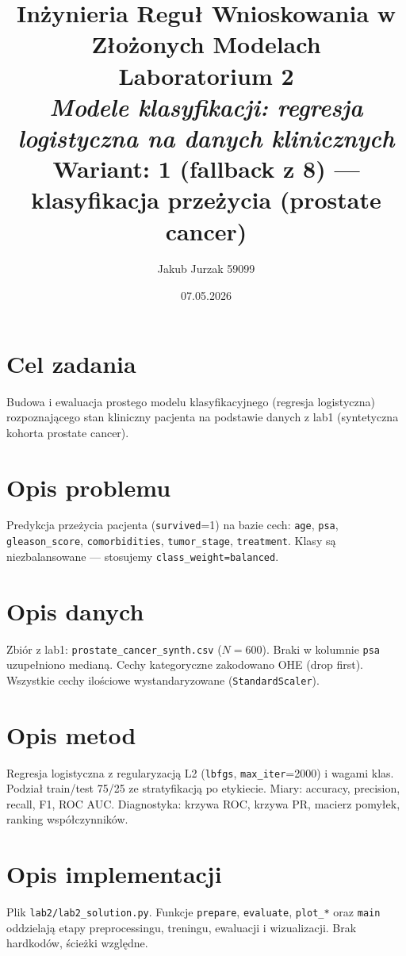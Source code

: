 \documentclass[12pt,a4paper]{article}
\title{
  \vspace{2cm}
  \LARGE\textbf{Inżynieria Reguł Wnioskowania w Złożonych Modelach}\\[0.6cm]
  \Large Laboratorium 2\\[0.4cm]
  \large \textit{Modele klasyfikacji: regresja logistyczna na danych klinicznych}\\[0.3cm]
  \normalsize Wariant: \textbf{1 (fallback z 8) — klasyfikacja przeżycia (prostate cancer)}
}
\author{Jakub Jurzak 59099}
\date{07.05.2026}
\begin{document}
\maketitle
\thispagestyle{empty}
\newpage

\tableofcontents
\newpage

\section{Cel zadania}
Budowa i ewaluacja prostego modelu klasyfikacyjnego (regresja logistyczna) rozpoznającego stan kliniczny pacjenta na podstawie danych z lab1 (syntetyczna kohorta prostate cancer).

\section{Opis problemu}
Predykcja przeżycia pacjenta (\texttt{survived}=1) na bazie cech: \texttt{age}, \texttt{psa}, \texttt{gleason\_score}, \texttt{comorbidities}, \texttt{tumor\_stage}, \texttt{treatment}. Klasy są niezbalansowane — stosujemy \texttt{class\_weight=balanced}.

\section{Opis danych}
Zbiór z lab1: \texttt{prostate\_cancer\_synth.csv} ($N=600$). Braki w kolumnie \texttt{psa} uzupełniono medianą. Cechy kategoryczne zakodowano OHE (drop first). Wszystkie cechy ilościowe wystandaryzowane (\texttt{StandardScaler}).

\section{Opis metod}
Regresja logistyczna z regularyzacją L2 (\texttt{lbfgs}, \texttt{max\_iter}=2000) i wagami klas. Podział train/test 75/25 ze stratyfikacją po etykiecie. Miary: accuracy, precision, recall, F1, ROC AUC. Diagnostyka: krzywa ROC, krzywa PR, macierz pomyłek, ranking współczynników.

\section{Opis implementacji}
Plik \texttt{lab2/lab2\_solution.py}. Funkcje \texttt{prepare}, \texttt{evaluate}, \texttt{plot\_*} oraz \texttt{main} oddzielają etapy preprocessingu, treningu, ewaluacji i wizualizacji. Brak hardkodów, ścieżki względne.
\end{document}
